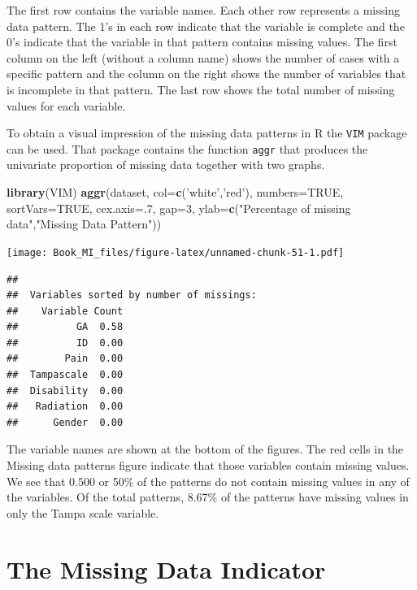 \documentclass[
]{book}
\newenvironment{Shaded}{\begin{snugshade}}{\end{snugshade}}
\newcommand{\DataTypeTok}[1]{\textcolor[rgb]{0.13,0.29,0.53}{#1}}
\newcommand{\DecValTok}[1]{\textcolor[rgb]{0.00,0.00,0.81}{#1}}
\newcommand{\KeywordTok}[1]{\textcolor[rgb]{0.13,0.29,0.53}{\textbf{#1}}}
\newcommand{\NormalTok}[1]{#1}
\newcommand{\OtherTok}[1]{\textcolor[rgb]{0.56,0.35,0.01}{#1}}
\newcommand{\StringTok}[1]{\textcolor[rgb]{0.31,0.60,0.02}{#1}}
\begin{document}
The first row contains the variable names. Each other row represents a
missing data pattern. The 1's in each row indicate that the variable is
complete and the 0's indicate that the variable in that pattern contains
missing values. The first column on the left (without a column name)
shows the number of cases with a specific pattern and the column on the
right shows the number of variables that is incomplete in that pattern.
The last row shows the total number of missing values for each variable.

To obtain a visual impression of the missing data patterns in R the
\texttt{VIM} package can be used. That package contains the function
\texttt{aggr} that produces the univariate proportion of missing data
together with two graphs.

\begin{Shaded}
\begin{Highlighting}[]
\KeywordTok{library}\NormalTok{(VIM)}
\KeywordTok{aggr}\NormalTok{(dataset, }\DataTypeTok{col=}\KeywordTok{c}\NormalTok{(}\StringTok{'white'}\NormalTok{,}\StringTok{'red'}\NormalTok{), }\DataTypeTok{numbers=}\OtherTok{TRUE}\NormalTok{, }\DataTypeTok{sortVars=}\OtherTok{TRUE}\NormalTok{, }\DataTypeTok{cex.axis=}\NormalTok{.}\DecValTok{7}\NormalTok{, }\DataTypeTok{gap=}\DecValTok{3}\NormalTok{, }\DataTypeTok{ylab=}\KeywordTok{c}\NormalTok{(}\StringTok{"Percentage of missing data"}\NormalTok{,}\StringTok{"Missing Data Pattern"}\NormalTok{))}
\end{Highlighting}
\end{Shaded}

\texttt{[image: Book\_MI\_files/figure-latex/unnamed-chunk-51-1.pdf]}

\begin{verbatim}
## 
##  Variables sorted by number of missings: 
##    Variable Count
##          GA  0.58
##          ID  0.00
##        Pain  0.00
##  Tampascale  0.00
##  Disability  0.00
##   Radiation  0.00
##      Gender  0.00
\end{verbatim}

The variable names are shown at the bottom of the figures. The red cells
in the Missing data patterns figure indicate that those variables
contain missing values. We see that 0.500 or 50\% of the patterns do not
contain missing values in any of the variables. Of the total patterns,
8.67\% of the patterns have missing values in only the Tampa scale
variable.

\hypertarget{the-missing-data-indicator}{%
\section{The Missing Data Indicator}\label{the-missing-data-indicator}}
\end{document}

